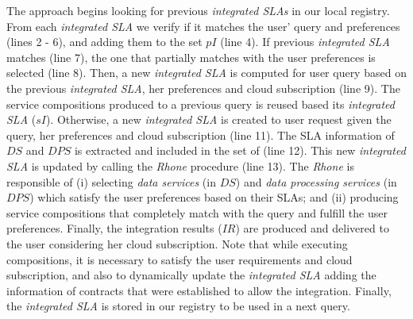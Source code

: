 The approach begins looking for previous \textit{integrated SLAs} in our
local registry. From each \textit{integrated SLA} we verify if it matches
the user' query and preferences (lines 2 - 6), and adding them to the set $pI$ (line 4).
%
If previous \textit{integrated SLA} matches (line 7), the one that
partially matches with the user preferences is selected (line 8).
%
Then, a new \textit{integrated SLA} is computed for user query based on the
previous \textit{integrated SLA}, her preferences and cloud subscription (line 9).
%
The service compositions produced to a previous query is reused based its \textit{integrated SLA} ($sI$). 
%
Otherwise, a new \textit{integrated SLA} is created to user request given the query, her preferences and cloud subscription (line 11). 
%
The SLA information of $\mathit{DS}$ and $\mathit{DPS}$ is extracted and included in the set of \bigS (line 12). 
%
This new \textit{integrated SLA} is updated by calling the \textit{Rhone} procedure (line 13). 
%
The \textit{Rhone} is responsible of (i) selecting \textit{data services} (in $DS$) and \textit{data processing services} (in $DPS$) which satisfy the user preferences based on their SLAs; and (ii) producing service compositions that completely match with the query and fulfill the user preferences. 
%
Finally, the integration results ($IR$) are produced and delivered to the user considering her cloud subscription. 
%
Note that while executing compositions, it is necessary to satisfy the user requirements and cloud subscription, and also to dynamically update the \textit{integrated SLA} adding the information of contracts that were established to allow the integration. 
%
Finally, the \textit{integrated SLA} is stored in our registry to be used in a next query.   


